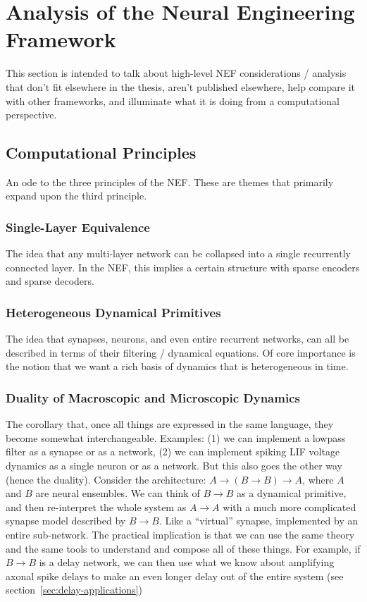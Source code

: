 \chapter{Analysis of the Neural Engineering Framework}
\label{chapt:analysis}

This section is intended to talk about high-level NEF considerations / analysis that don't fit elsewhere in the thesis, aren't published elsewhere, help compare it with other frameworks, and illuminate what it is doing from a computational perspective.

\section{Computational Principles}

An ode to the three principles of the NEF.
These are themes that primarily expand upon the third principle.

\subsection{Single-Layer Equivalence}

The idea that any multi-layer network can be collapsed into a single recurrently connected layer.
In the NEF, this implies a certain structure with sparse encoders and sparse decoders.

\subsection{Heterogeneous Dynamical Primitives}

The idea that synapses, neurons, and even entire recurrent networks, can all be described in terms of their filtering / dynamical equations.
Of core importance is the notion that we want a rich basis of dynamics that is heterogeneous in time.

\subsection{Duality of Macroscopic and Microscopic Dynamics}

The corollary that, once all things are expressed in the same language, they become somewhat interchangeable.
Examples: (1) we can implement a lowpass filter as a synapse or as a network, (2) we can implement spiking LIF voltage dynamics as a single neuron or as a network.
But this also goes the other way (hence the duality).
Consider the architecture: $A \rightarrow (B \rightarrow B) \rightarrow A$, where $A$ and $B$ are neural ensembles.
We can think of $B \rightarrow B$ as a dynamical primitive, and then re-interpret the whole system as $A \rightarrow A$ with a much more complicated synapse model described by $B \rightarrow B$.
Like a ``virtual'' synapse, implemented by an entire sub-network.
The practical implication is that we can use the same theory and the same tools to understand and compose all of these things.
For example, if $B \rightarrow B$ is a delay network, we can then use what we know about amplifying axonal spike delays to make an even longer delay out of the entire system (see section~\ref{sec:delay-applications})

